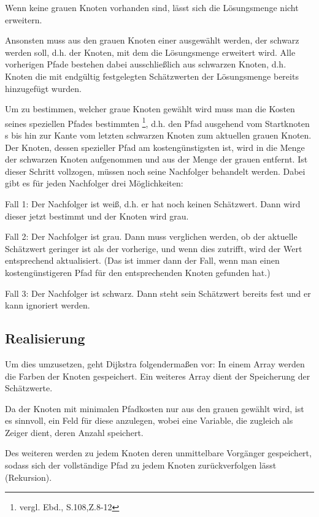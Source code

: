 \parindent0pt Wenn keine grauen Knoten vorhanden sind, lässt sich die Lösungsmenge nicht erweitern. 

\parindent0pt Ansonsten muss aus den grauen Knoten einer ausgewählt werden, der schwarz werden soll, d.h. der Knoten, mit dem die Lösungsmenge erweitert wird. Alle vorherigen Pfade bestehen dabei ausschließlich aus schwarzen Knoten, d.h. Knoten die mit endgültig festgelegten Schätzwerten der Lösungsmenge bereits hinzugefügt wurden.

\parindent0pt Um zu bestimmen, welcher graue Knoten gewählt wird muss man die Kosten seines speziellen Pfades bestimmten \footnote{vergl. Ebd., S.108,Z.8-12}, d.h. den Pfad ausgehend vom Startknoten s bis hin zur Kante vom letzten schwarzen Knoten zum aktuellen grauen Knoten. Der Knoten, dessen spezieller Pfad am kostengünstigsten ist, wird in die Menge der schwarzen Knoten aufgenommen und aus der Menge der grauen entfernt. Ist dieser Schritt vollzogen, müssen noch seine Nachfolger behandelt werden. Dabei gibt es für jeden Nachfolger drei Möglichkeiten:

\parindent0pt Fall 1: Der Nachfolger ist weiß, d.h. er hat noch keinen Schätzwert. Dann wird dieser jetzt bestimmt und der Knoten wird grau.

\parindent0pt Fall 2: Der Nachfolger ist grau. Dann muss verglichen werden, ob der aktuelle Schätzwert geringer ist als der vorherige, und wenn dies zutrifft, wird der Wert entsprechend aktualisiert. (Das ist immer dann der Fall, wenn man einen kostengünstigeren Pfad für den entsprechenden Knoten gefunden hat.)

\parindent0pt Fall 3: Der Nachfolger ist schwarz. Dann steht sein Schätzwert bereits fest und er kann ignoriert werden.

\subsection{Realisierung}
Um dies umzusetzen, geht Dijkstra folgendermaßen vor: In einem Array werden die Farben der Knoten gespeichert. Ein weiteres Array dient der Speicherung der Schätzwerte. 

\parindent0pt Da der Knoten mit minimalen Pfadkosten nur aus den grauen gewählt wird, ist es sinnvoll, ein Feld für diese anzulegen, wobei eine Variable, die zugleich als Zeiger dient, deren Anzahl speichert.

\parindent0pt Des weiteren werden zu jedem Knoten deren unmittelbare Vorgänger gespeichert, sodass sich der vollständige Pfad zu jedem Knoten zurückverfolgen lässt (Rekursion).

